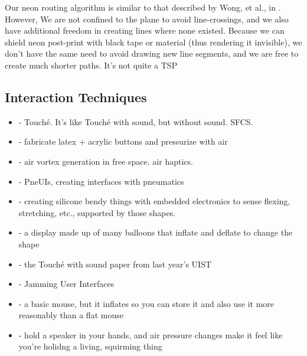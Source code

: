 Our neon routing algorithm is similar to that described by Wong, et al., in \cite{Wong-continuousline}.  However, We are not confined to the plane to avoid line-crossings, and we also have additional freedom in creating lines where none existed.  Because we can shield neon post-print with black tape or material (thus rendering it invisible), we don't have the same need to avoid drawing new line segments, and we are free to create much shorter paths.  It's not quite a TSP

\subsection{Interaction Techniques}
\begin{itemize}
\item \cite{Sato-touche} - Touch\'{e}.  It's like Touch\'{e} with sound, but without sound.  SFCS.
\item \cite{Harrison-buttons} - fabricate latex + acrylic buttons and pressurize with air
\item \cite{Sodhi-aireal} - air vortex generation in free space.  air haptics.
\item \cite{Yao-pneui} - PneUIs, creating interfaces with pneumatics
\item \cite{Slyper-shape} - creating silicone bendy things with embedded electronics to sense flexing, stretching, etc., supported by those shapes.
\item \cite{Iwata-volflex} - a display made up of many balloons that inflate and deflate to change the shape
\item \cite{Ono-touchandactivate} - the Touch\'{e} with sound paper from last year's UIST
\item \cite{Follmer-jamming} - Jamming User Interfaces
\item \cite{Kim-inflatablemouse} - a basic mouse, but it inflates so you can store it and also use it more reasonably than a flat mouse
\item \cite{Hashimoto-squirming} - hold a speaker in your hands, and air pressure changes make it feel like you're holidng a living, squirming thing
\end{itemize}

